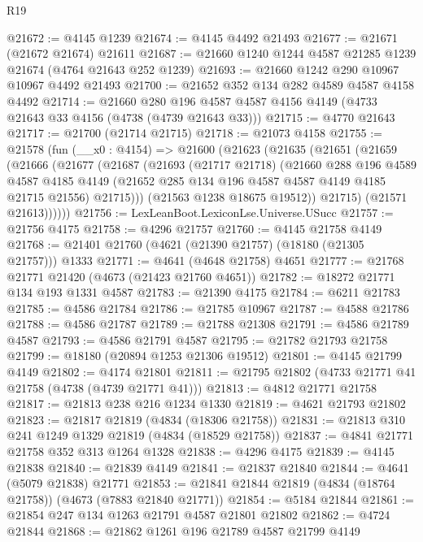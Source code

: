 \begin{lexlean}{R19}
\begin{coremodule}
@21672 := @4145 @1239
@21674 := @4145 @4492 @21493
@21677 := @21671 (@21672 @21674) @21611
@21687 := @21660 @1240 @1244 @4587 @21285 @1239 @21674 (@4764 @21643 @252 @1239)
@21693 := @21660 @1242 @290 @10967 @10967 @4492 @21493
@21700 := @21652 @352 @134 @282 @4589 @4587 @4158 @4492
@21714 := @21660
    @280
    @196
    @4587
    @4587
    @4156
    @4149
    (@4733 @21643 @33 @4156 (@4738 (@4739 @21643 @33)))
@21715 := @4770 @21643
@21717 := @21700 (@21714 @21715)
@21718 := @21073 @4158
@21755 := @21578
    (fun (__x0 : @4154) =>
    @21600
      (@21623
        (@21635
          (@21651
            (@21659
              (@21666
                (@21677
                  (@21687
                    (@21693
                      (@21717 @21718)
                      (@21660
                        @288
                        @196
                        @4589
                        @4587
                        @4185
                        @4149
                        (@21652 @285 @134 @196 @4587 @4587 @4149 @4185 @21715 @21556)
                        @21715)))
                  (@21563 @1238 @18675 @19512))
                @21715)
              (@21571 @21613))))))
@21756 := LexLeanBoot.LexiconLse.Universe.USucc
@21757 := @21756 @4175
@21758 := @4296 @21757
@21760 := @4145 @21758 @4149
@21768 := @21401 @21760 (@4621 (@21390 @21757) (@18180 (@21305 @21757))) @1333
@21771 := @4641 (@4648 @21758) @4651
@21777 := @21768 @21771 @21420 (@4673 (@21423 @21760 @4651))
@21782 := @18272 @21771 @134 @193 @1331 @4587
@21783 := @21390 @4175
@21784 := @6211 @21783
@21785 := @4586 @21784
@21786 := @21785 @10967
@21787 := @4588 @21786
@21788 := @4586 @21787
@21789 := @21788 @21308
@21791 := @4586 @21789 @4587
@21793 := @4586 @21791 @4587
@21795 := @21782 @21793 @21758
@21799 := @18180 (@20894 @1253 @21306 @19512)
@21801 := @4145 @21799 @4149
@21802 := @4174 @21801
@21811 := @21795 @21802 (@4733 @21771 @41 @21758 (@4738 (@4739 @21771 @41)))
@21813 := @4812 @21771 @21758
@21817 := @21813 @238 @216 @1234 @1330
@21819 := @4621 @21793 @21802
@21823 := @21817 @21819 (@4834 (@18306 @21758))
@21831 := @21813 @310 @241 @1249 @1329 @21819 (@4834 (@18529 @21758))
@21837 := @4841 @21771 @21758 @352 @313 @1264 @1328
@21838 := @4296 @4175
@21839 := @4145 @21838
@21840 := @21839 @4149
@21841 := @21837 @21840
@21844 := @4641 (@5079 @21838) @21771
@21853 := @21841 @21844 @21819 (@4834 (@18764 @21758)) (@4673 (@7883 @21840 @21771))
@21854 := @5184 @21844
@21861 := @21854 @247 @134 @1263 @21791 @4587 @21801 @21802
@21862 := @4724 @21844
@21868 := @21862 @1261 @196 @21789 @4587 @21799 @4149

\end{coremodule}
\end{lexlean}
